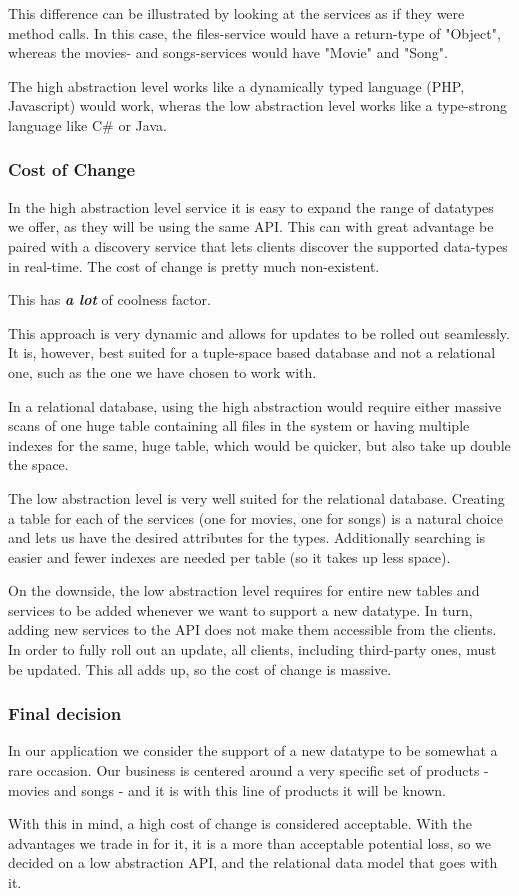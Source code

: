 This difference can be illustrated by looking at the services as if they were method calls.
In this case, the files-service would have a return-type of "Object", whereas the movies-
and songs-services would have "Movie" and "Song".

The high abstraction level works like a dynamically typed language (PHP, Javascript) would
work, wheras the low abstraction level works like a type-strong language like C\# or Java.

\subsubsection{Cost of Change}
In the high abstraction level service it is easy to expand the range of datatypes we offer,
as they will be using the same API. This can with great advantage be paired with a discovery
service that lets clients discover the supported data-types in real-time. The cost of change
is pretty much non-existent.

This has \textbf{\emph{a lot}} of coolness factor.

This approach is very dynamic and allows for updates to be rolled out seamlessly. It is, however,
best suited for a tuple-space based database and not a relational one, such as the one we have
chosen to work with.

In a relational database, using the high abstraction would require either massive scans of one
huge table containing all files in the system or having multiple indexes for the same, huge table,
which would be quicker, but also take up double the space.

The low abstraction level is very well suited for the relational database. Creating a table for each
of the services (one for movies, one for songs) is a natural choice and lets us have the desired
attributes for the types. Additionally searching is easier and fewer indexes are needed per table
(so it takes up less space).

On the downside, the low abstraction level requires for entire new tables and services to be added
whenever we want to support a new datatype. In turn, adding new services to the API does not make
them accessible from the clients. In order to fully roll out an update, all clients,
including third-party ones, must be updated. This all adds up, so the cost of change is massive.

\subsubsection{Final decision}
In our application we consider the support of a new datatype to be somewhat a rare occasion. Our
business is centered around a very specific set of products - movies and songs - and it is with
this line of products it will be known.

With this in mind, a high cost of change is considered acceptable. With the advantages we trade in for
it, it is a more than acceptable potential loss, so we decided on a low abstraction API, and the relational
data model that goes with it.